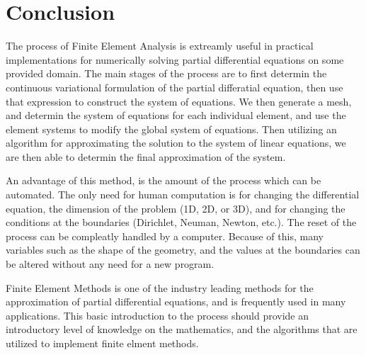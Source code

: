 \documentclass[../fem.tex]{subfiles}
\begin{document}
\section{Conclusion}%
\label{sec:conclusion}

The process of Finite Element Analysis is extreamly useful in practical
implementations for numerically solving partial differential equations on some
provided domain. The main stages of the process are to first determin the
continuous variational formulation of the partial differatial equation, then
use that expression to construct the system of equations. We then generate a
mesh, and determin the system of equations for each individual element, and use
the element systems to modify the global system of equations. Then utilizing an
algorithm for approximating the solution to the system of linear equations, we
are then able to determin the final approximation of the system.

An advantage of this method, is the amount of the process which can be
automated. The only need for human computation is for changing the differential
equation, the dimension of the problem (1D, 2D, or 3D), and for changing the
conditions at the boundaries (Dirichlet, Neuman, Newton, etc.). The reset of
the process can be compleatly handled by a computer. Because of this, many
variables such as the shape of the geometry, and the values at the boundaries
can be altered without any need for a new program.

Finite Element Methods is one of the industry leading methods for the
approximation of partial differential equations, and is frequently used in many
applications. This basic introduction to the process should provide an
introductory level of knowledge on the mathematics, and the algorithms that are
utilized to implement finite elment methods.
\end{document}
